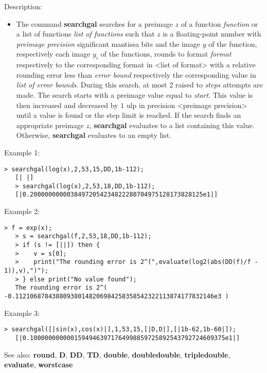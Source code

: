 \noindent Description: \begin{itemize}

\item The command \textbf{searchgal} searches for a preimage $z$ of a function
   \emph{function} or a list of functions \emph{list of functions} such that
   $z$ is a floating-point number with \emph{preimage precision}
   significant mantissa bits and the image $y$ of the function,
   respectively each image $y_i$ of the functions, rounds to
   format \emph{format} respectively to the corresponding format in <list of
   format> with a relative rounding error less than \emph{error bound}
   respectively the corresponding value in \emph{list of error bounds}. During
   this search, at most 2 raised to \emph{steps} attempts are made. The search
   starts with a preimage value equal to \emph{start}. This value is then
   increased and decreased by $1$ ulp in precision <preimage
   precision> until a value is found or the step limit is reached.
   If the search finds an appropriate preimage $z$, \textbf{searchgal}
   evaluates to a list containing this value. Otherwise, \textbf{searchgal}
   evaluates to an empty list.
\end{itemize}
\noindent Example 1: 
\begin{center}\begin{minipage}{14.8cm}\begin{Verbatim}[frame=single]
   > searchgal(log(x),2,53,15,DD,1b-112);
   [| |]
   > searchgal(log(x),2,53,18,DD,1b-112);
   [|0.20000000000384972054234822280704975128173828125e1|]
\end{Verbatim}
\end{minipage}\end{center}
\noindent Example 2: 
\begin{center}\begin{minipage}{14.8cm}\begin{Verbatim}[frame=single]
   > f = exp(x);
   > s = searchgal(f,2,53,18,DD,1b-112);
   > if (s != [||]) then {
   >    v = s[0];
   >    print("The rounding error is 2^(",evaluate(log2(abs(DD(f)/f - 1)),v),")");
   > } else print("No value found");
   The rounding error is 2^( -0.112106878438809380148206984258358542322113874177832146e3 )
\end{Verbatim}
\end{minipage}\end{center}
\noindent Example 3: 
\begin{center}\begin{minipage}{14.8cm}\begin{Verbatim}[frame=single]
   > searchgal([|sin(x),cos(x)|],1,53,15,[|D,D|],[|1b-62,1b-60|]);
   [|0.10000000000015949463971764998859725892543792724609375e1|]
\end{Verbatim}
\end{minipage}\end{center}
See also: \textbf{round}, \textbf{D}, \textbf{DD}, \textbf{TD}, \textbf{double}, \textbf{doubledouble}, \textbf{tripledouble}, \textbf{evaluate}, \textbf{worstcase}
